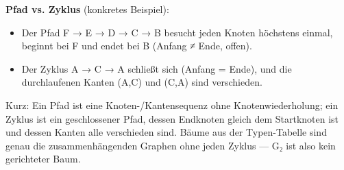 \documentclass[11pt, a4paper]{article}
\begin{document}
\textbf{Pfad vs. Zyklus} (konkretes Beispiel):

\begin{itemize}
  \item Der Pfad F → E → D → C → B besucht jeden Knoten höchstens einmal, beginnt bei F und endet bei B (Anfang ≠ Ende, offen).
  \item Der Zyklus A → C → A schließt sich (Anfang = Ende), und die durchlaufenen Kanten (A,C) und (C,A) sind verschieden.
\end{itemize}

Kurz: Ein Pfad ist eine Knoten-/Kantensequenz ohne Knotenwiederholung; ein Zyklus ist ein geschlossener Pfad, dessen Endknoten gleich dem Startknoten ist und dessen Kanten alle verschieden sind. Bäume aus der Typen-Tabelle sind genau die zusammenhängenden Graphen ohne jeden Zyklus — G₂ ist also kein gerichteter Baum.





\end{document}
